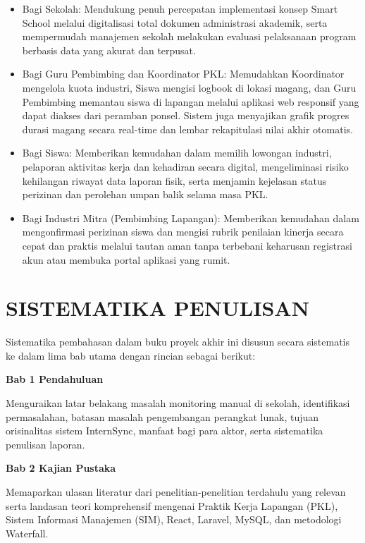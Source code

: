 \begin{itemize}
\item Bagi Sekolah: Mendukung penuh percepatan implementasi konsep Smart School melalui digitalisasi total dokumen administrasi akademik, serta mempermudah manajemen sekolah melakukan evaluasi pelaksanaan program berbasis data yang akurat dan terpusat.
\item Bagi Guru Pembimbing dan Koordinator PKL: Memudahkan Koordinator mengelola kuota industri, Siswa mengisi logbook di lokasi magang, dan Guru Pembimbing memantau siswa di lapangan melalui aplikasi web responsif yang dapat diakses dari peramban ponsel. Sistem juga menyajikan grafik progres durasi magang secara real-time dan lembar rekapitulasi nilai akhir otomatis.
\item Bagi Siswa: Memberikan kemudahan dalam memilih lowongan industri, pelaporan aktivitas kerja dan kehadiran secara digital, mengeliminasi risiko kehilangan riwayat data laporan fisik, serta menjamin kejelasan status perizinan dan perolehan umpan balik selama masa PKL.
\item Bagi Industri Mitra (Pembimbing Lapangan): Memberikan kemudahan dalam mengonfirmasi perizinan siswa dan mengisi rubrik penilaian kinerja secara cepat dan praktis melalui tautan aman tanpa terbebani keharusan registrasi akun atau membuka portal aplikasi yang rumit.
\end{itemize}

\section{SISTEMATIKA PENULISAN}

Sistematika pembahasan dalam buku proyek akhir ini disusun secara sistematis ke dalam lima bab utama dengan rincian sebagai berikut:

\noindent\textbf{Bab 1 Pendahuluan}\par\nopagebreak

Menguraikan latar belakang masalah monitoring manual di sekolah, identifikasi permasalahan, batasan masalah pengembangan perangkat lunak, tujuan orisinalitas sistem InternSync, manfaat bagi para aktor, serta sistematika penulisan laporan.

\noindent\textbf{Bab 2 Kajian Pustaka}\par\nopagebreak

Memaparkan ulasan literatur dari penelitian-penelitian terdahulu yang relevan serta landasan teori komprehensif mengenai Praktik Kerja Lapangan (PKL), Sistem Informasi Manajemen (SIM), React, Laravel, MySQL, dan metodologi Waterfall.

